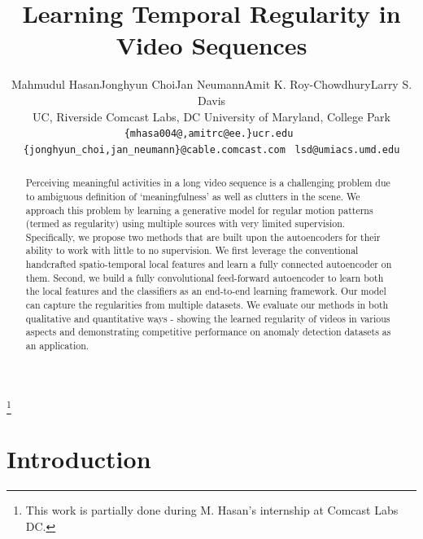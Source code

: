 \documentclass[10pt,twocolumn,letterpaper]{article}
\newcommand\blfootnote[1]{\begingroup
  \renewcommand\thefootnote{}\footnote{#1}\addtocounter{footnote}{-1}\endgroup
}
\begin{document}
\title{Learning Temporal Regularity in Video Sequences}



\author{
Mahmudul Hasan\hspace{1em}Jonghyun Choi\hspace{1em}Jan Neumann\hspace{1em}Amit K. Roy-Chowdhury\hspace{1em}Larry S. Davis
\vspace{0.5em}
\\
UC, Riverside\hspace{2em}
Comcast Labs, DC\hspace{2em}
University of Maryland, College Park
\\
{\tt\footnotesize \{mhasa004@,amitrc@ee.\}ucr.edu}~
{\tt\footnotesize \{jonghyun\_choi,jan\_neumann\}@cable.comcast.com}~
{\tt\footnotesize lsd@umiacs.umd.edu}
}


\maketitle


\blfootnote{This work is partially done during M. Hasan's internship at Comcast Labs DC.}

\begin{abstract}


Perceiving meaningful activities in a long video sequence is a challenging problem due to ambiguous definition of `meaningfulness' as well as clutters in the scene.
We approach this problem by learning a generative model for regular motion patterns (termed as regularity) using multiple sources with very limited supervision.
Specifically, we propose two methods that are built upon the autoencoders for their ability to work with little to no supervision.
We first leverage the conventional handcrafted spatio-temporal local features and learn a fully connected autoencoder on them.
Second, we build a fully convolutional feed-forward autoencoder to learn both the local features and the classifiers as an end-to-end learning framework.
Our model can capture the regularities from multiple datasets.
We evaluate our methods in both qualitative and quantitative ways - showing the learned regularity of videos in various aspects and demonstrating competitive performance on anomaly detection datasets as an application.


%
 \end{abstract}



\section{Introduction}
\label{sec:intro}
\end{document}
